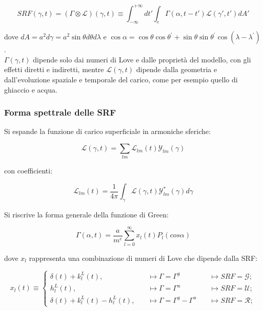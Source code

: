 \documentclass[a4paper,12pt]{book}
\begin{document}
\begin{equation}
    SRF(\gamma,t) = (\Gamma \otimes \mathcal{L} ) (\gamma,t) \equiv \int_{-\infty}^{+\infty} dt' \int_e \Gamma (\alpha, t-t') \mathcal{L}(\gamma', t') dA'
\end{equation}

\noindent
dove $dA = a^2 d\gamma = a^2 \sin\theta d\theta d\lambda$
e $\cos\alpha = \cos\theta\cos\theta^\prime + \sin\theta\sin\theta^\prime \cos(\lambda - \lambda^\prime)$.\\
$\Gamma (\gamma,t)$ dipende solo dai numeri di Love e dalle proprietà del modello, con gli effetti diretti e indiretti,
mentre $\mathcal{L} (\gamma,t)$ dipende dalla geometria e dall'evoluzione spaziale e temporale del carico, come per esempio quello di ghiaccio e acqua.

\subsubsection{\textcolor{colore7}{Forma spettrale delle SRF}}

Si espande la funzione di carico superficiale in armoniche sferiche:

\begin{equation}
    \mathcal{L}(\gamma,t) = \sum_{lm} \mathcal{L}_{lm}(t) \mathcal{Y}_{lm} (\gamma)
\end{equation}

\noindent
con coefficienti:

\begin{equation}
   \mathcal{L}_{lm}(t) = \frac{1}{4\pi} \int_\gamma \mathcal{L}(\gamma,t) \mathcal{Y}_{lm}^* (\gamma) d\gamma
\end{equation}

\noindent
Si riscrive la forma generale della funzione di Green:

\begin{equation}
    \Gamma (\alpha, t) = \frac{a}{m^e} \sum_{l=0}^\infty x_l (t) P_l (cos \alpha)
\end{equation}

\noindent
dove $x_l$ rappresenta una combinazione di numeri di Love che dipende dalla SRF:

\begin{equation}
x_l(t) \equiv 
\left\{
\begin{aligned}
  \delta(t) + k_l^L(t), &\quad \mapsto \Gamma = \Gamma^g &\quad \mapsto SRF = \mathcal{G}; \\
  h_l^L(t),              &\quad \mapsto \Gamma = \Gamma^u &\quad \mapsto SRF = \mathcal{U}; \\
  \delta(t) + k_l^L(t) - h_l^L(t), &\quad \mapsto \Gamma = \Gamma^g - \Gamma^u &\quad \mapsto SRF = \mathcal{R};
\end{aligned}
\right.
\end{equation}
\end{document}
